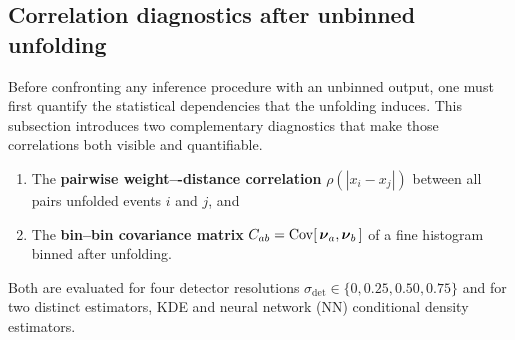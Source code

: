     \subsection{Correlation diagnostics after unbinned unfolding}
    \label{subsec:weight_correlations}
        Before confronting any inference procedure with an unbinned output, one must first quantify the statistical dependencies that the unfolding induces.
        This subsection introduces two complementary diagnostics that make those correlations both visible and quantifiable.
        \begin{enumerate}
            \item The \textbf{pairwise weight–-distance correlation} $\rho(|x_i-x_j|)$ between all pairs unfolded events $i$ and $j$, and
            \item The \textbf{bin--bin covariance matrix} $C_{ab} = \operatorname{Cov}[\,\vb*{\nu}_a,\vb*{\nu}_b\,]$ of a fine histogram binned {after} unfolding.
        \end{enumerate}
        Both are evaluated for four detector resolutions $\sigma_{\det}\in\{0,0.25,0.50,0.75\}$ and for two distinct estimators, {KDE} and neural network (\textsc{NN}) conditional density estimators.

